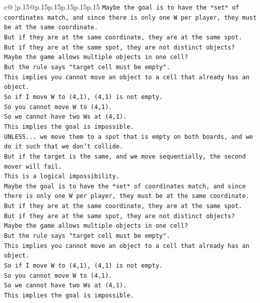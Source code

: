 \documentclass{article}
\begin{document}
{\begin{supertabular}{c@{$\;$}|p{.15\linewidth}@{}p{.15\linewidth}p{.15\linewidth}p{.15\linewidth}p{.15\linewidth}p{.15\linewidth}}
{{{\texttt{Maybe the goal is to have the *set* of coordinates match, and since there is only one W per player, they must be at the same coordinate.} \\
\texttt{But if they are at the same coordinate, they are at the same spot.} \\
\texttt{But if they are at the same spot, they are not distinct objects?} \\
\texttt{Maybe the game allows multiple objects in one cell?} \\
\texttt{But the rule says "target cell must be empty".} \\
\texttt{This implies you cannot move an object to a cell that already has an object.} \\
\texttt{So if I move W to (4,1), (4,1) is not empty.} \\
\texttt{So you cannot move W to (4,1).} \\
\texttt{So we cannot have two Ws at (4,1).} \\
\texttt{This implies the goal is impossible.} \\
\texttt{UNLESS... we move them to a spot that is empty on both boards, and we do it such that we don't collide.} \\
\texttt{But if the target is the same, and we move sequentially, the second mover will fail.} \\
\texttt{This is a logical impossibility.} \\
\texttt{Maybe the goal is to have the *set* of coordinates match, and since there is only one W per player, they must be at the same coordinate.} \\
\texttt{But if they are at the same coordinate, they are at the same spot.} \\
\texttt{But if they are at the same spot, they are not distinct objects?} \\
\texttt{Maybe the game allows multiple objects in one cell?} \\
\texttt{But the rule says "target cell must be empty".} \\
\texttt{This implies you cannot move an object to a cell that already has an object.} \\
\texttt{So if I move W to (4,1), (4,1) is not empty.} \\
\texttt{So you cannot move W to (4,1).} \\
\texttt{So we cannot have two Ws at (4,1).} \\
\texttt{This implies the goal is impossible.} \\
}}}
\end{supertabular}}
\end{document}
